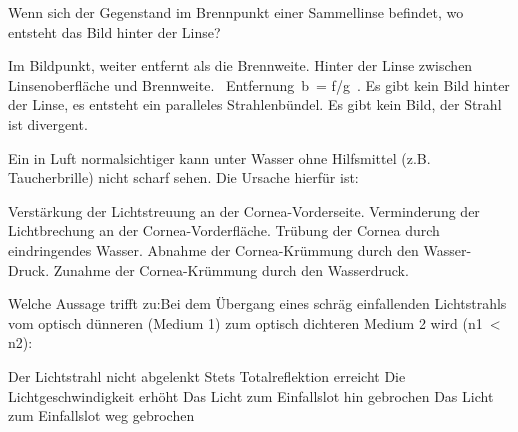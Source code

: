 \documentclass[11pt]{exam}
\begin{document}
\setlength{\voffset}{-0.5in}
\setlength{\headsep}{5pt}

\hspace{2mm}
 \hspace{5mm}
\vspace{4mm}

\begin{questions}

\question Wenn sich der Gegenstand im Brennpunkt einer Sammellinse befindet, wo entsteht das Bild hinter der Linse?

\begin{choices}
	\choice Im Bildpunkt, weiter entfernt als die Brennweite.
	\choice Hinter der Linse zwischen Linsenoberfläche und Brennweite.
	\choice  Entfernung b = f/g .
	\choice Es gibt kein Bild hinter der Linse, es entsteht ein paralleles Strahlenbündel.
	\choice Es gibt kein Bild, der Strahl ist divergent.
\end{choices}

\vspace{3mm}\question Ein in Luft normalsichtiger kann unter Wasser ohne Hilfsmittel (z.B. Taucherbrille) nicht scharf sehen. Die Ursache hierfür ist:

\begin{choices}
	\choice Verstärkung der Lichtstreuung an der Cornea-Vorderseite.
	\choice Verminderung der Lichtbrechung an der Cornea-Vorderfläche.
	\choice Trübung der Cornea durch eindringendes Wasser.
	\choice Abnahme der Cornea-Krümmung durch den Wasser-Druck.
	\choice Zunahme der Cornea-Krümmung durch den Wasserdruck.
\end{choices}

\vspace{3mm}\question Welche Aussage trifft zu:Bei dem Übergang eines schräg einfallenden Lichtstrahls vom optisch dünneren (Medium 1) zum optisch dichteren Medium 2 wird (n1 < n2):

\begin{choices}
	\choice Der Lichtstrahl nicht abgelenkt
	\choice Stets Totalreflektion erreicht
	\choice Die Lichtgeschwindigkeit erhöht
	\choice Das Licht zum Einfallslot hin gebrochen
	\choice Das Licht zum Einfallslot weg gebrochen
\end{choices}


\end{questions}
\end{document}
